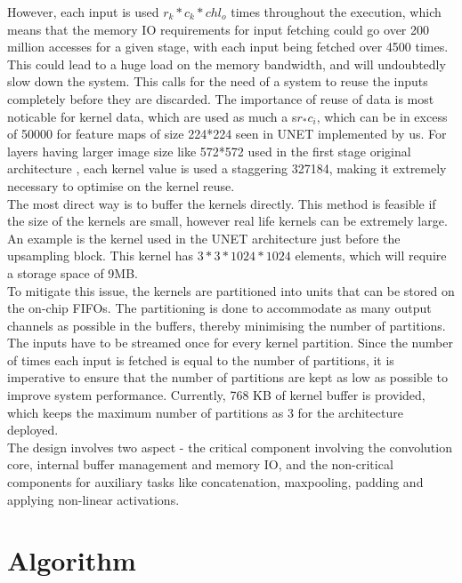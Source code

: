 \documentclass[a4paper,12pt, final]{report}
\begin{document}
However, each input is used $r_k*c_k*chl_o$ times throughout the execution, which means that the memory IO requirements for input fetching could go over 200 million accesses for a given stage, with each input being fetched over 4500 times. This could lead to a huge load on the memory bandwidth, and will undoubtedly slow down the system. This calls for the need of a system to reuse the inputs completely before they are discarded. The importance of reuse of data is most noticable for kernel data, which are used as much a s$r_*c_i$, which can be in excess of 50000 for feature maps of size 224*224 seen in UNET implemented by us. For layers having larger image size like 572*572 used in the first stage original architecture \cite{UNET}, each kernel value is used a staggering 327184, making it extremely necessary to optimise on the kernel reuse.
\\

The most direct way is to buffer the kernels directly. This method is feasible if the size of the kernels are small, however real life kernels can be extremely large. An example is the kernel used in the UNET architecture just before the upsampling block. This kernel has $3*3*1024*1024$ elements, which will require a storage space of 9MB.
\\

To mitigate this issue, the kernels are partitioned into units that can be stored on the on-chip FIFOs. The partitioning is done to accommodate as many output channels as possible in the buffers, thereby minimising the number of partitions. The inputs have to be streamed once for every kernel partition. Since the number of times each input is fetched is equal to the number of partitions, it is imperative to ensure that the number of partitions are kept as low as possible to improve system performance. Currently, 768 KB of kernel buffer is provided, which keeps the maximum number of partitions as 3 for the architecture deployed.
\\

The design involves two aspect - the critical component involving the convolution core, internal buffer management and memory IO, and the non-critical components for auxiliary tasks like concatenation, maxpooling, padding and applying non-linear activations.
\\

\section{Algorithm}
\end{document}
